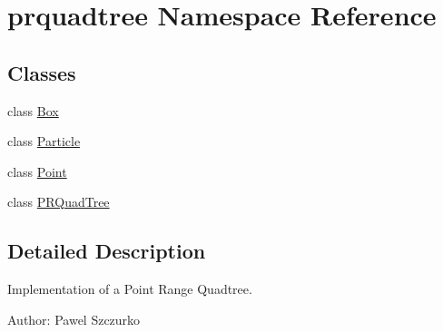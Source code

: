 \section{prquadtree Namespace Reference}
\label{namespaceprquadtree}
\subsection*{Classes}
\begin{DoxyCompactItemize}
\item 
class \hyperlink{classprquadtree_1_1Box}{Box}
\item 
class \hyperlink{classprquadtree_1_1Particle}{Particle}
\item 
class \hyperlink{classprquadtree_1_1Point}{Point}
\item 
class \hyperlink{classprquadtree_1_1PRQuadTree}{P\+R\+Quad\+Tree}
\end{DoxyCompactItemize}


\subsection{Detailed Description}
\begin{DoxyVerb}Implementation of a Point Range Quadtree.

Author: Pawel Szczurko
\end{DoxyVerb}
 